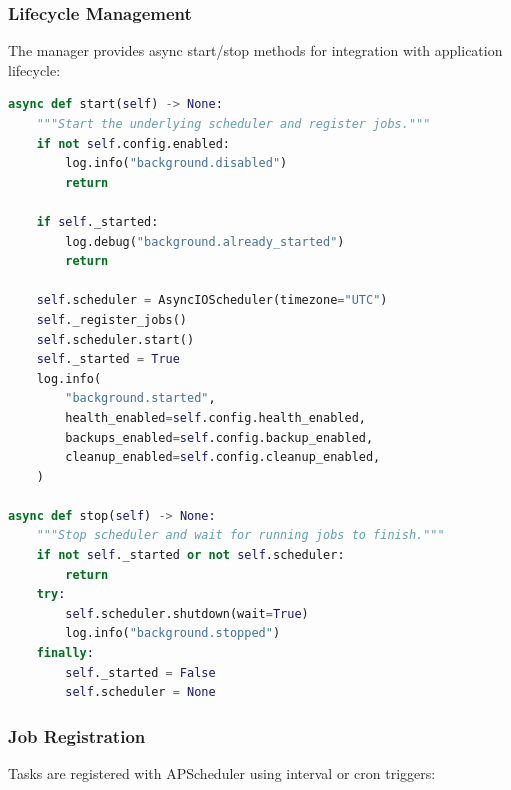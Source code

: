 \subsubsection{Lifecycle Management}

The manager provides async start/stop methods for integration with application lifecycle:

\begin{lstlisting}[language=Python, caption={Background manager lifecycle methods.}]
async def start(self) -> None:
    """Start the underlying scheduler and register jobs."""
    if not self.config.enabled:
        log.info("background.disabled")
        return

    if self._started:
        log.debug("background.already_started")
        return

    self.scheduler = AsyncIOScheduler(timezone="UTC")
    self._register_jobs()
    self.scheduler.start()
    self._started = True
    log.info(
        "background.started",
        health_enabled=self.config.health_enabled,
        backups_enabled=self.config.backup_enabled,
        cleanup_enabled=self.config.cleanup_enabled,
    )

async def stop(self) -> None:
    """Stop scheduler and wait for running jobs to finish."""
    if not self._started or not self.scheduler:
        return
    try:
        self.scheduler.shutdown(wait=True)
        log.info("background.stopped")
    finally:
        self._started = False
        self.scheduler = None
\end{lstlisting}

\subsubsection{Job Registration}

Tasks are registered with APScheduler using interval or cron triggers:

